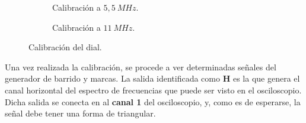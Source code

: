    \begin{figure}[H]
      \centering
      \begin{subfigure}[ht]{0.48\textwidth}
        \caption{Calibración a $5,5~MHz$.}
        \label{fig:Calib5_5MHz}
      \end{subfigure}
      \hfill 
      \begin{subfigure}[ht]{0.48\textwidth}
        \caption{Calibración a $11~MHz$.}
        \label{fig:Calib11MHz}
      \end{subfigure}

      \caption{Calibración del dial.}
      \label{fig:CalibDial}
    \end{figure}

    Una vez realizada la calibración, se procede a ver determinadas señales del generador de barrido y marcas. La salida
    identificada como \textbf{H} es la que genera el canal horizontal del espectro de frecuencias que puede ser visto
    en el osciloscopio. Dicha salida se conecta en al \textbf{canal 1} del osciloscopio, y, como es de esperarse, la señal debe 
    tener una forma de triangular.

